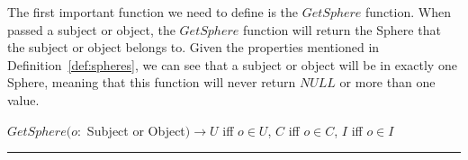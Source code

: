 
\noindent The first important function we need to define is the $GetSphere$
function. When passed a subject or object, the $GetSphere$ function will return
the Sphere that the subject or object belongs to. Given the properties mentioned
in Definition~\ref{def:spheres}, we can see that a subject or object will be in
exactly one Sphere, meaning that this function will never return $NULL$ or more
than one value.

\begin{definition}[GetSphere]\label{def:getsphere}
$GetSphere(o:$ Subject or Object$) \rightarrow U$ iff $o \in U$, $C$ iff $o \in 
C$, $I$ iff $o \in I$\\
\hrule \mbox{}\\
\end{definition}

